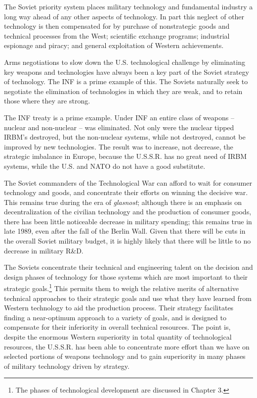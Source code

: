 The Soviet priority system places military technology and fundamental industry a long way ahead of any other aspects of technology. In part this neglect of other technology is then compensated for by purchase of nonstrategic goods and technical processes from the West; scientific exchange programs; industrial espionage and piracy; and general exploitation of Western achievements.

Arms negotiations to slow down the U.S. technological challenge by eliminating key weapons and technologies have always been a key part of the Soviet strategy of technology. The INF is a prime example of this. The Soviets naturally seek to negotiate the elimination of technologies in which they are weak, and to retain those where they are strong.

The INF treaty is a prime example. Under INF an entire class of weapons -- nuclear and non-nuclear -- was eliminated. Not only were the nuclear tipped IRBM's destroyed, but the non-nuclear systems, while not destroyed, cannot be improved by new technologies. The result was to increase, not decrease, the strategic imbalance in Europe, because the U.S.S.R. has no great need of IRBM systems, while the U.S. and NATO do not have a good substitute.

The Soviet commanders of the Technological War can afford to wait for consumer technology and goods, and concentrate their efforts on winning the decisive war. This remains true during the era of \textit{glasnost}; although there is an emphasis on decentralization of the civilian technology and the production of consumer goods, there has been little noticeable decrease in military spending; this remains true in late 1989, even after the fall of the Berlin Wall. Given that there will be cuts in the overall Soviet military budget, it is highly likely that there will be little to no decrease in military R\&D.

The Soviets concentrate their technical and engineering talent on the decision and design phases of technology for those systems which are most important to their strategic goals.\footnote{
The phases of technological development are discussed in Chapter 3.
} This permits them to weigh the relative merits of alternative technical approaches to their strategic goals and use what they have learned from Western technology to aid the production process. Their strategy facilitates finding a near-optimum approach to a variety of goals, and is designed to compensate for their inferiority in overall technical resources. The point is, despite the enormous Western superiority in total quantity of technological resources, the U.S.S.R. has been able to concentrate more effort than we have on selected portions of weapons technology and to gain superiority in many phases of military technology driven by strategy.

